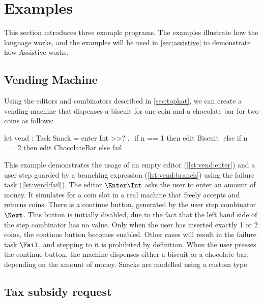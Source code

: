 
\section{Examples}
\label{sec:examples}

This section introduces three example \TOPHAT programs.
The examples illustrate how the \TOPHAT language works, and the examples will be used in \cref{sec:assistive} to demonstrate how Assistive \TOPHAT works.


\subsection{Vending Machine}

Using the editors and combinators described in \cref{sec:tophat},
we can create a vending machine that dispenses a biscuit for one coin and a chocolate bar for two coins as follows:


\begin{TASK}[
    float=ht,
    numbers=right,
    caption={Vending machine dispensing biscuits or chocolate.},
    captionpos=b,
    label=lst:vending]
  let vend : Task Snack = enter Int >>? \n. $\label{lst:vend:enter}$
    if n == 1 then edit Biscuit             $\label{lst:vend:branch}$
    else if n == 2 then edit ChocolateBar
    else fail                               $\label{lst:vend:fail}$
\end{TASK}

This example demonstrates the usage of an empty editor (\cref{lst:vend:enter}) and
a user step guarded by a branching expression (\cref{lst:vend:branch}) using the failure task (\cref{lst:vend:fail}).
The editor $\Enter \Int$ asks the user to enter an amount of money.
It simulates for a coin slot in a real machine that freely accepts and returns coins.
There is a continue button, generated by the user step combinator $\Next$.
This button is initially disabled, due to the fact that the left hand side of the step combinator has no value.
Only when the user has inserted exactly 1 or 2 coins, the continue button becomes enabled.
Other cases will result in the failure task $\Fail$, and stepping to it is prohibited by definition.
When the user presses the continue button, the machine dispenses either a biscuit or a chocolate bar, depending on the amount of money.
Snacks are modelled using a custom type.


\subsection{Tax subsidy request}
\label{sec:tax}

